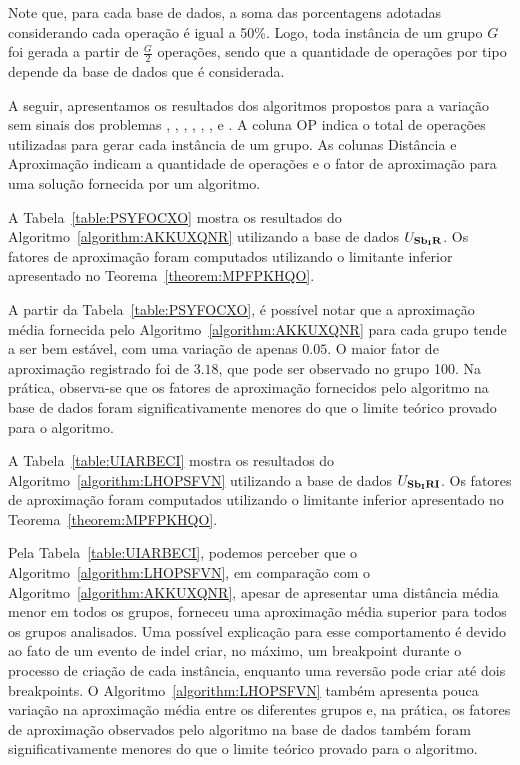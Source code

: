 

Note que, para cada base de dados, a soma das porcentagens adotadas considerando cada operação é igual a 50\%. Logo, toda instância de um grupo $G$ foi gerada a partir de $\frac{G}{2}$ operações, sendo que a quantidade de operações por tipo depende da base de dados que é considerada.   

A seguir, apresentamos os resultados dos algoritmos propostos para a variação sem sinais dos problemas \SbIR{}, \SbIRI{}, \SbIRM{}, \SbIRMI{}, \SbIRT{}, \SbIRTI{}, \SbIRTM{} e \SbIRTMI{}. A coluna OP indica o total de operações utilizadas para gerar cada instância de um grupo. As colunas Distância e Aproximação indicam a quantidade de operações e o fator de aproximação para uma solução fornecida por um algoritmo.

A Tabela~\ref{table:PSYFOCXO} mostra os resultados do Algoritmo~\ref{algorithm:AKKUXQNR} utilizando a base de dados $U_{\textbf{Sb\textsubscript{I}R}}{}$. Os fatores de aproximação foram computados utilizando o limitante inferior apresentado no Teorema~\ref{theorem:MPFPKHQO}.



A partir da Tabela~\ref{table:PSYFOCXO}, é possível notar que a aproximação média fornecida pelo Algoritmo~\ref{algorithm:AKKUXQNR} para cada grupo tende a ser bem estável, com uma variação de apenas $0.05$. O maior fator de aproximação registrado foi de $3.18$, que pode ser observado no grupo 100. Na prática, observa-se que os fatores de aproximação fornecidos pelo algoritmo na base de dados foram significativamente menores do que o limite teórico provado para o algoritmo.

A Tabela~\ref{table:UIARBECI} mostra os resultados do Algoritmo~\ref{algorithm:LHOPSFVN} utilizando a base de dados $U_{\textbf{Sb\textsubscript{I}RI}}{}$. Os fatores de aproximação foram computados utilizando o limitante inferior apresentado no Teorema~\ref{theorem:MPFPKHQO}.



Pela Tabela~\ref{table:UIARBECI}, podemos perceber que o Algoritmo~\ref{algorithm:LHOPSFVN}, em comparação com o Algoritmo~\ref{algorithm:AKKUXQNR}, apesar de apresentar uma distância média menor em todos os grupos, forneceu uma aproximação média superior para todos os grupos analisados. Uma possível explicação para esse comportamento é devido ao fato de um evento de indel criar, no máximo, um breakpoint durante o processo de criação de cada instância, enquanto uma reversão pode criar até dois breakpoints. O Algoritmo~\ref{algorithm:LHOPSFVN} também apresenta pouca variação na aproximação média entre os diferentes grupos e, na prática, os fatores de aproximação observados pelo algoritmo na base de dados também foram significativamente menores do que o limite teórico provado para o algoritmo.

